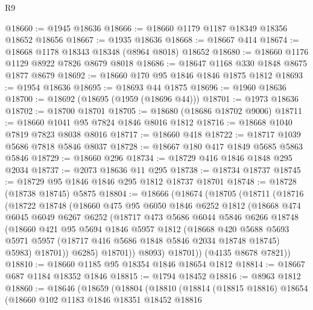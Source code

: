 \begin{lexlean}{R9}
\begin{coremodule}
@18660 := @1945 @18636
@18666 := @18660 @1179 @1187 @18349 @18356 @18652 @18656
@18667 := @1935 @18636
@18668 := @18667 @414
@18674 := @18668 @1178 @18343 @18348 (@8964 @8018) @18652
@18680 := @18660 @1176 @1129 @8922 @7826 @8679 @8018
@18686 := @18647 @1168 @330 @1848 @8675 @1877 @8679
@18692 := @18660 @170 @95 @1846 @1846 @1875 @1812
@18693 := @1954 @18636
@18695 := @18693 @44 @1875
@18696 := @1960 @18636
@18700 := @18692 (@18695 (@1959 (@18696 @44)))
@18701 := @1973 @18636
@18702 := @18700 @18701
@18705 := @18680 (@18686 @18702 @9006)
@18711 := @18660 @1041 @95 @7824 @1846 @8016 @1812
@18716 := @18668 @1040 @7819 @7823 @8038 @8016
@18717 := @18660 @418
@18722 := @18717 @1039 @5686 @7818 @5846 @8037
@18728 := @18667 @180 @417 @1849 @5685 @5863 @5846
@18729 := @18660 @296
@18734 := @18729 @416 @1846 @1848 @295 @2034
@18737 := @2073 @18636 @11 @295
@18738 := @18734 @18737
@18745 := @18729 @95 @1846 @1846 @295 @1812 @18737 @18701
@18748 := @18728 (@18738 @18745) @5875
@18804 := @18666
    (@18674
      (@18705
        (@18711
          (@18716
            (@18722
              @18748
              (@18660
                @475
                @95
                @6050
                @1846
                @6252
                @1812
                (@18668
                  @474
                  @6045
                  @6049
                  @6267
                  @6252
                  (@18717
                    @473
                    @5686
                    @6044
                    @5846
                    @6266
                    @18748
                    (@18660
                      @421
                      @95
                      @5694
                      @1846
                      @5957
                      @1812
                      (@18668
                        @420
                        @5688
                        @5693
                        @5971
                        @5957
                        (@18717 @416 @5686 @1848 @5846 @2034 @18748 @18745)
                        @5983)
                      @18701))
                  @6285)
                @18701))
            @8093)
          @18701))
      (@4135 @8678 @7821))
@18810 := @18660 @1185 @95 @18354 @1846 @18654 @1812
@18814 := @18667 @687 @1184 @18352 @1846
@18815 := @1794 @18452
@18816 := @8963 @1812
@18860 := @18646
    (@18659
      (@18804
        (@18810
          (@18814
            (@18815 @18816)
            @18654
            (@18660
              @102
              @1183
              @1846
              @18351
              @18452
              @18816

\end{coremodule}
\end{lexlean}
